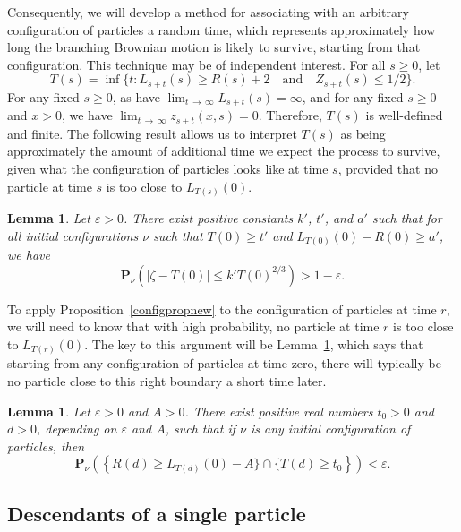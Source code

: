 \documentclass[10pt]{amsart}
\newtheorem{lemm}[theo]{Lemma}\newtheorem{prop}[theo]{Proposition}\newtheorem{coro}[theo]{Corollary}\newtheorem{conj}[theo]{Conjecture}
\theoremstyle{definition}\newtheorem{defi}[theo]{Definition}\newtheorem{rema}[theo]{Remark}\newtheorem{exam}[theo]{Example}\newtheorem{exem}[theo]{Example}\newtheorem{nota}[theo]{Notation}
\newcommand*\eps{\varepsilon}
\renewcommand*\P{\mathbf{P}}
\newcommand{\1} {\mathds{1}}
\begin{document}
Consequently, we will develop a method for associating with an arbitrary configuration of particles a random time, which represents approximately how long the branching Brownian motion is likely to survive, starting from that configuration. This technique may be of independent interest. For all $s \geq 0$, let
\begin{equation}\label{Tdef}
T(s) = \inf\big\{t: L_{s+t}(s) \geq R(s) + 2 \quad\text{and}\quad Z_{s+t}(s) \leq 1/2\big\}.
\end{equation}
For any fixed $s \geq 0$, as have $\lim_{t\,\rightarrow \,\infty} L_{s+t}(s) = \infty$, and for any fixed $s \geq 0$ and $x > 0$, we have $\lim_{t\,\rightarrow \,\infty} z_{s+t}(x,s) = 0$. Therefore, $T(s)$ is well-defined and finite. The following result allows us to interpret $T(s)$ as being approximately the amount of additional time we expect the process to survive, given what the configuration of particles looks like at time $s$, provided that no particle at time $s$ is too close to $L_{T(s)}(0)$.

\begin{lemm}\label{tightextinct}
Let $\eps > 0$. There exist positive constants $k'$, $t'$, and $a'$ such that for all initial configurations $\nu$ such that $T(0) \geq t'$ and $L_{T(0)}(0) - R(0) \geq a'$, we have
\[
\P_{\nu}\left(\left|\zeta - T(0)\right| \leq k' T(0)^{2/3}\right) > 1 - \eps.
\]
\end{lemm}

To apply Proposition~\ref{configpropnew} to the configuration of particles at time $r$, we will need to know that with high probability, no particle at time $r$ is too close to $L_{T(r)}(0)$. The key to this argument will be Lemma~\ref{mainLRlemma}, which says that starting from any configuration of particles at time zero, there will typically be no particle close to this right boundary a short time later.

\begin{lemm}\label{mainLRlemma}
Let $\eps > 0$ and $A > 0$. There exist positive real numbers $t_0 > 0$ and $d > 0$, depending on $\eps$ and $A$, such that if $\nu$ is any initial configuration of particles, then
\[
\P_{\nu}\left(\left\{R(d) \geq L_{T(d)}(0) - A\} \cap \{T(d) \geq t_0\right\}\right) < \eps.
\]
\end{lemm}

\subsection{Descendants of a single particle}\label{sec:descendants}
\end{document}
